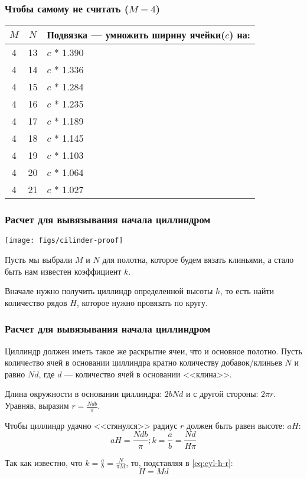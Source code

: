 \begin{frame}
    \frametitle{Чтобы самому не считать ($M=4$)}
	
	\begin{center}	
		\begin{tabular}{c|c|l}
			\hline\hline
			$M$ & $N$ &Подвязка --- умножить ширину ячейки($c$) на: \\ 
			\hline\hline
			4 & 13 & $c$ * 1.390 \\ 
			4 & 14 & $c$ * 1.336 \\ 
			4 & 15 & $c$ * 1.284 \\ 
			4 & 16 & $c$ * 1.235 \\ 
			4 & 17 & $c$ * 1.189 \\ 
			4 & 18 & $c$ * 1.145 \\ 
			4 & 19 & $c$ * 1.103 \\ 
			4 & 20 & $c$ * 1.064 \\ 
			4 & 21 & $c$ * 1.027 \\
			\hline		
		\end{tabular}
	\end{center}	
\end{frame}

\begin{frame}
    \frametitle{Расчет для вывязывания начала циллиндром}

    \begin{center}
        \texttt{[image: figs/cilinder-proof]}
    \end{center}
	
	Пусть мы выбрали $M$ и $N$ для полотна, которое будем вязать клиньями, а стало быть нам известен коэффициент $k$.

	Вначале нужно получить циллиндр определенной высоты $h$, то есть найти количество рядов $H$, которое нужно провязать по кругу. 
\end{frame}

\begin{frame}
    \frametitle{Расчет для вывязывания начала циллиндром}

	Циллиндр должен иметь такое же раскрытие ячеи, что и основное полотно. Пусть количеcтво ячей в основании циллиндра кратно количеству добавок/клиньев $N$ и равно $Nd$, где $d$ --- количество ячей в основании <<клина>>.
	
	Длина окружности в основании циллиндра: $2bNd$ и с другой стороны: $2\pi r$. Уравняв, выразим $r=\frac{Ndb}{\pi}$.
	
	Чтобы циллиндр удачно <<стянулся>> радиус $r$ должен быть равен высоте: $aH$:
	\begin{equation}
		\label{eq:cyl-h-r}
		aH=\frac{Ndb}{\pi}; k=\frac{a}{b}=\frac{Nd}{H\pi}
	\end{equation}
	
	Так как известно, что $k=\frac{a}{b}=\frac{N}{\pi M}$, то, подставляя в \eqref{eq:cyl-h-r}:
	\begin{equation}
		\label{eq:cyl-h}
		H=Md
	\end{equation}
\end{frame}

